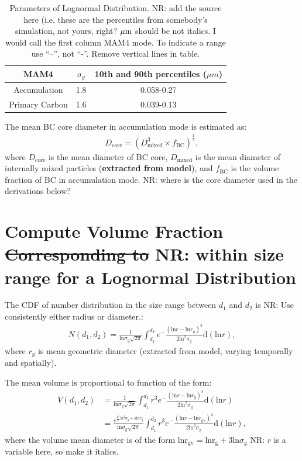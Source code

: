 \documentclass[11pt]{article}
\newcommand{\nrtodo}[1]{{\color{blue} NR: #1}}
\begin{document}
\begin{table}
	\begin{center}
		\begin{tabular}{c|c|c}
			\hline  
			MAM4 & $\sigma_{g}$ &  10th and 90th percentiles ($\mu m$)		\\   \hline
			Accumulation  & 1.8  &   0.058-0.27 		\\ \hline
			Primary Carbon   & 1.6  &  0.039-0.13  		\\
			\hline			
		\end{tabular}
	\end{center}
\caption{\label{tab:ozone} Parameters of Lognormal
  Distribution. \nrtodo{add the source here (i.e. these are the
    percentiles from somebody's simulation, not yours, right? $\rm \mu
    m$ should be not italics. I would call the first column MAM4
    mode. To indicate a range use ``--'', not ``-''. Remove vertical lines in
    table. } \label{tab:mam4_modes}}
\end{table}


\bigskip
\noindent The mean BC core diameter in accumulation mode is estimated as:
\begin{align*}
D_{\text{core}} = (D_{\text{mixed}}^3 \times f_{\text{BC}})^\frac{1}{3}, 
\end{align*}
where $D_{\text{core}}$ is the mean diameter of BC core,
$D_{\text{mixed}}$ is the mean diameter of internally mixed particles
(\textbf{extracted from model}), and $f_{\text{BC}}$ is the volume
fraction of BC in accumulation mode.  \nrtodo{where is the core
  diameter used in the derivations below?}


 
\section{Compute Volume Fraction \sout{Corresponding to} \nrtodo{within size range} for a Lognormal Distribution}
The CDF of number distribution in the size range between $d_{1}$ and
$d_{2}$ is \nrtodo{Use consistently either radius or diameter.}:
\begin{align*}
N(d_{1}, d_{2}) = \frac{1}{\text{ln}\sigma_{\text{g}}\sqrt{2\pi}}\int_{d_{1}}^{d_{2}}e^-\frac{(\text{ln}r - \text{ln}r_{g})^2}{2\text{ln}^2\sigma_{\text{g}}}\text{d}(\text{ln}r),
\end{align*}
where $r_{g}$ is mean geometric diameter (extracted from model, varying temporally and spatially). 

\noindent The mean volume is proportional to function of the form:
\begin{align*}
V(d_{1}, d_{2}) &= \frac{1}{\text{ln}\sigma_{\text{g}}\sqrt{2\pi}}\int_{d_{1}}^{d_{2}}r^3e^-\frac{(\text{ln}r - \text{ln}r_{g})^2}{2\text{ln}^2\sigma_{\text{g}}}\text{d}(\text{ln}r)  \\
&=\frac{e^{\frac{k^2}{2}\text{ln}^2\sigma_{g}+k\text{ln}r_{g}}}{\text{ln}\sigma_{\text{g}}\sqrt{2\pi}}\int_{d_{1}}^{d_{2}}r^3e^-\frac{(\text{ln}r - \text{ln}r_{\text{gv}})^2}{2\text{ln}^2\sigma_{\text{g}}}\text{d}(\text{ln}r),
\end{align*}
where the volume mean diameter is of the form $\text{lnr}_{\text{gv}}
= \text{lnr}_{\text{g}} + 3\text{ln}\sigma_{\text{g}}$ \nrtodo{$r$ is
  a variable here, so make it italics}.
\end{document}
